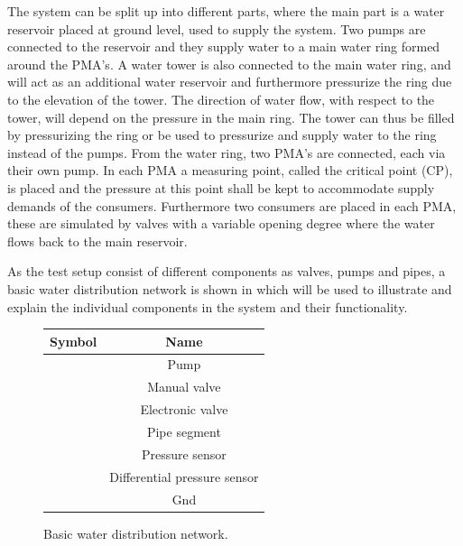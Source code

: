 The system can be split up into different parts, where the main part is a water reservoir placed at ground level, used to supply the system. Two pumps are connected to the reservoir and they supply water to a main water ring formed around the PMA's. 
A water tower is also connected to the main water ring, and will act as an additional water reservoir and furthermore pressurize the ring due to the elevation of the tower. The direction of water flow, with respect to the tower, will depend on the pressure in the main ring. The tower can thus be filled by pressurizing the ring or be used to pressurize and supply water to the ring instead of the pumps.  
From the water ring, two PMA's are connected, each via their own pump. In each PMA a measuring point, called the critical point (CP), is placed and the pressure at this point shall be kept to accommodate supply demands of the consumers. Furthermore two consumers are placed in each PMA, these are simulated by valves with a variable opening degree where the water flows back to the main reservoir.    

As the test setup consist of different components as valves, pumps and pipes, a basic water distribution network is shown in  which will be used to illustrate and explain the individual components in the system and their functionality.   
	
\begin{figure}[H]
	\centering
	\begin{minipage}[b]{0.45\textwidth}
		\centering
		 
		\caption{Basic water distribution network.}
		\label{fig:Basic_example_sys}
	\end{minipage}
	\hspace{15pt}
	\begin{minipage}[b]{0.45\textwidth}
		\begin{tabular}{|c|c|} \hline
  			\bfseries Symbol 	 					&   \bfseries Name 					\\ \hline
			 		  	&	Pump							\\ \hline
			 	&	Manual valve					\\ \hline
			 		&	Electronic valve				\\ \hline
			 		  	&	Pipe segment					\\ \hline
			 &	Pressure sensor					\\ \hline
			 	&	Differential pressure sensor	\\ \hline
			 		  	&	Gnd								\\ \hline
		\end{tabular}
		\label{tab:sys_comp_overview}
	\end{minipage}
\end{figure}

